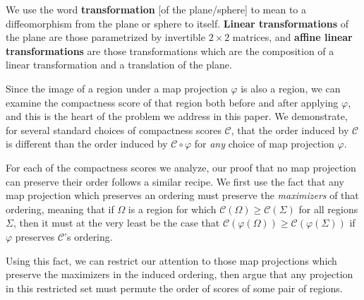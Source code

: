 \begin{definition}
We use the word \textbf{transformation} [of the plane/sphere] to mean to a diffeomorphism from the plane or sphere to itself.  \textbf{Linear transformations} of the plane are those parametrized by invertible $2{\times}2$ matrices, and \textbf{affine linear transformations} are those transformations which are the composition of a linear transformation and a translation of the plane.
\end{definition}




Since the image of a region under a map projection $\varphi$ is also a region, we can examine the compactness score of that region both before and after applying $\varphi$, and this is the heart of the problem we address in this paper.  We demonstrate, for several standard choices of compactness scores $\mathcal{C}$, that the order induced by $\mathcal{C}$ is different than the order induced by $\mathcal{C}\circ\varphi$ for \textit{any} choice of map projection $\varphi$.




For each of the compactness scores we analyze, our proof that no map projection can preserve their order follows a similar recipe.  We first use the fact that any map projection which preserves an ordering must preserve the \textit{maximizers} of that ordering, meaning that if $\Omega$ is a region for which $\mathcal{C}(\Omega)\geq \mathcal{C}(\Sigma)$ for all regions $\Sigma$, then it must at the very least be the case that $\mathcal{C}(\varphi(\Omega))\geq \mathcal{C}(\varphi(\Sigma))$ if $\varphi$ preserves $\mathcal{C}$'s ordering.

Using this fact, we can restrict our attention to those map projections which preserve the maximizers in the induced ordering, then argue that any projection in this restricted set must permute the order of scores of some pair of regions.